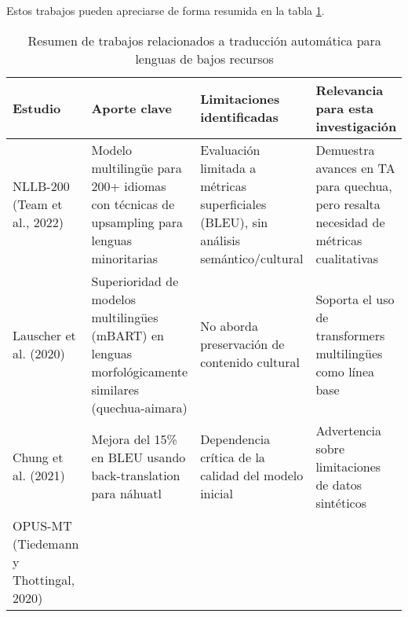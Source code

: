 Estos trabajos pueden apreciarse de forma resumida  en la tabla \ref{tab:trabajos-relacionados}.

\begin{table}[htbp]
	\centering
	\caption{Resumen de trabajos relacionados a traducción automática para lenguas de bajos recursos\\}
	\label{tab:trabajos-relacionados}
	\begin{tabularx}{\textwidth}{|p{3cm}|>{\raggedright\arraybackslash}X|>{\raggedright\arraybackslash}X|>{\raggedright\arraybackslash}X|}
		\hline
		\textbf{Estudio}                                                                                    & \textbf{Aporte clave} & \textbf{Limitaciones identificadas} & \textbf{Relevancia para esta investigación} \\
		\hline
		NLLB-200 \newline (Team et al., 2022)                                                               &
		Modelo multilingüe para 200+ idiomas con técnicas de upsampling para lenguas minoritarias           &
		Evaluación limitada a métricas superficiales (BLEU), sin análisis semántico/cultural                &
		Demuestra avances en TA para quechua, pero resalta necesidad de métricas cualitativas                                                                                                                           \\
		\hline
		Lauscher et al. (2020)                                                                              &
		Superioridad de modelos multilingües (mBART) en lenguas morfológicamente similares (quechua-aimara) &
		No aborda preservación de contenido cultural                                                        &
		Soporta el uso de transformers multilingües como línea base                                                                                                                                                     \\
		\hline
		Chung et al. (2021)                                                                                 &
		Mejora del 15\% en BLEU usando back-translation para náhuatl                                        &
		Dependencia crítica de la calidad del modelo inicial                                                &
		Advertencia sobre limitaciones de datos sintéticos                                                                                                                                                              \\
		\hline
		OPUS-MT \newline (Tiedemann y Thottingal, 2020)                                                     &

\end{tabularx}
\end{table}
